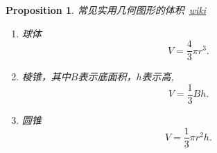 \documentclass{article}
\newtheorem{proposition}[theorem]{Proposition}
\begin{document}
\begin{proposition}
\rm 常见实用几何图形的体积~\href{https://zh.wikipedia.org/wiki/\%E4\%BD\%93\%E7\%A7\%AF}{wiki}
\begin{enumerate}
	\item 球体
	$$
	V = \frac{4}{3}\pi r^3.
	$$
	\item 棱锥，其中$B$表示底面积，$h$表示高,
	$$
	V = \frac{1}{3}Bh.
	$$
	\item 圆锥
	$$
	V = \frac{1}{3}\pi r^2 h .
	$$
\end{enumerate}
\end{proposition}
\end{document}
